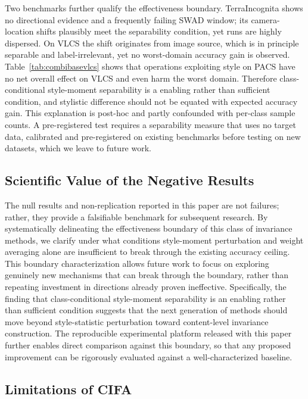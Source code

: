 \documentclass[electronics,article,submit,moreauthors]{Definitions/mdpi}
\newcommand{\add}[1]{\textcolor{addblue}{#1}}
\newcommand{\del}[1]{\textcolor{delred}{\st{#1}}}
\def\add#1{#1}
\def\del#1{}
\begin{document}
Two benchmarks further qualify the \del{validity}\add{effectiveness} boundary. TerraIncognita shows no directional evidence and a frequently failing SWAD window; its camera-location shifts plausibly meet the separability condition, yet runs are highly dispersed. On VLCS the shift originates from image source, which is in principle separable and label-irrelevant, yet no worst-domain accuracy gain is observed. Table~\ref{tab:combibasevlcs} shows that operations exploiting style on PACS have no net overall effect on VLCS and even harm the worst domain. Therefore class-conditional style-moment separability is a enabling rather than sufficient condition, and stylistic difference should not be equated with expected accuracy gain. This explanation is post-hoc and partly confounded with per-class sample counts. A pre-registered test requires a separability measure that uses no target data, calibrated and pre-registered on existing benchmarks before testing on new datasets, which we leave to future work.

\subsection{Scientific Value of the Negative Results}

The null results and non-replication reported in this paper are not failures; rather, they provide a falsifiable benchmark for subsequent research. By systematically delineating the \del{validity}\add{effectiveness} boundary of this class of invariance methods, we clarify under what conditions style-moment perturbation and weight averaging alone are insufficient to break through the existing accuracy ceiling. This boundary characterization allows future work to focus on exploring genuinely new mechanisms that can break through the boundary, rather than repeating investment in directions already proven ineffective. Specifically, the finding that class-conditional style-moment separability is an enabling rather than sufficient condition suggests that the next generation of methods should move beyond style-statistic perturbation toward content-level invariance construction. The reproducible experimental platform released with this paper further enables direct comparison against this boundary, so that any proposed improvement can be rigorously evaluated against a well-characterized baseline.


\subsection{Limitations of CIFA}
\end{document}
